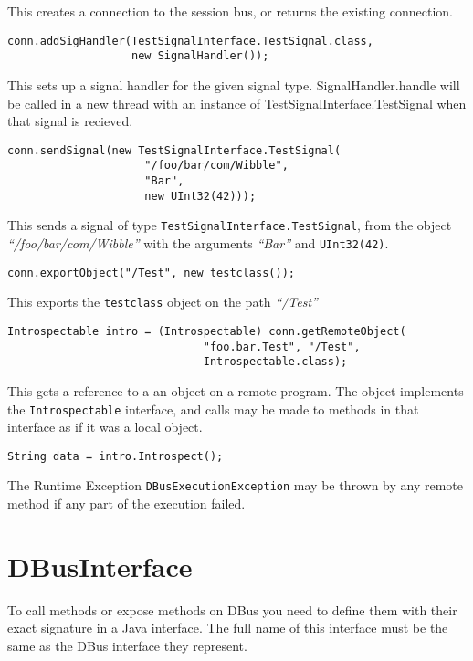 \documentclass[a4paper,12pt]{article}
\begin{document}
This creates a connection to the session bus, or returns the
existing connection.

\begin{verbatim}
conn.addSigHandler(TestSignalInterface.TestSignal.class,
                   new SignalHandler());
\end{verbatim}

This sets up a signal handler for the given signal type.
SignalHandler.handle will be called in a new thread with an instance
of TestSignalInterface.TestSignal when that signal is recieved.

\begin{verbatim}
conn.sendSignal(new TestSignalInterface.TestSignal(
                     "/foo/bar/com/Wibble", 
                     "Bar", 
                     new UInt32(42)));
\end{verbatim}

This sends a signal of type {\tt TestSignalInterface.TestSignal},
from the object {\em ``/foo/bar/com/Wibble''} with the arguments {\em
``Bar''} and {\tt UInt32(42)}.

\begin{verbatim}
conn.exportObject("/Test", new testclass());
\end{verbatim}

This exports the {\tt testclass} object on the path {\em ``/Test''}

\begin{verbatim}
Introspectable intro = (Introspectable) conn.getRemoteObject(
                              "foo.bar.Test", "/Test",
                              Introspectable.class);
\end{verbatim}

This gets a reference to a an object on a remote program. The object
implements the {\tt Introspectable} interface, and calls may be made
to methods in that interface as if it was a local object.

\begin{verbatim}
String data = intro.Introspect();
\end{verbatim}

The Runtime Exception {\tt DBusExecutionException} may be thrown
by any remote method if any part of the execution failed.

\section{DBusInterface}

To call methods or expose methods on DBus you need to define them
with their exact signature in a Java interface. The full name of
this interface must be the same as the DBus interface they
represent.
\end{document}
